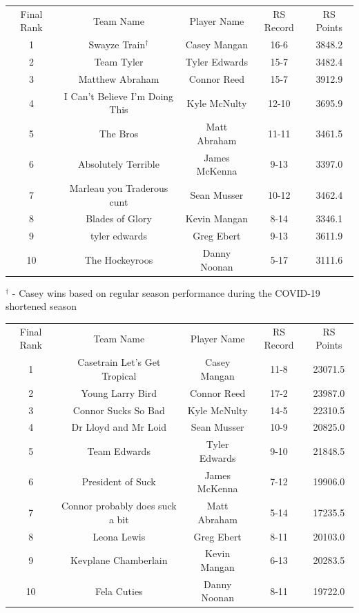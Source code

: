 \documentclass[11pt,letterpaper]{article}
\begin{document}
\vspace{-25pt}
\begin{table} [h]
\begin{center}
\begin{tabular} { c c c c c }
\\ Final Rank & Team Name & Player Name & RS Record & RS Points
\\ 1 & Swayze Train$^\dag$ & Casey Mangan & 16-6 & 3848.2
\\ 2 & Team Tyler & Tyler Edwards & 15-7 & 3482.4
\\ 3 & Matthew Abraham & Connor Reed & 15-7 & 3912.9
\\ 4 & I Can't Believe I'm Doing This & Kyle McNulty & 12-10 & 3695.9
\\ 5 & The Bros & Matt Abraham & 11-11 & 3461.5
\\ 6 & Absolutely Terrible & James McKenna & 9-13 & 3397.0
\\ 7 & Marleau you Traderous cunt & Sean Musser & 10-12 & 3462.4
\\ 8 & Blades of Glory & Kevin Mangan & 8-14 & 3346.1
\\ 9 & tyler edwards & Greg Ebert & 9-13 & 3611.9
\\ 10 & The Hockeyroos & Danny Noonan & 5-17 & 3111.6
\end{tabular}
\end{center}
\noindent$^\dag$ - Casey wins based on regular season performance during the COVID-19 shortened season
\end{table}

\newpage
{}
\vspace{-25pt}
\begin{table} [h]
\begin{center}
\begin{tabular} { c c c c c }
\\ Final Rank & Team Name & Player Name & RS Record & RS Points
\\ 1 & Casetrain Let's Get Tropical & Casey Mangan & 11-8 & 23071.5
\\ 2 & Young Larry Bird & Connor Reed & 17-2 & 23987.0
\\ 3 & Connor Sucks So Bad & Kyle McNulty & 14-5 & 22310.5
\\ 4 & Dr Lloyd and Mr Loid & Sean Musser & 10-9 & 20825.0
\\ 5 & Team Edwards & Tyler Edwards & 9-10 & 21848.5
\\ 6 & President of Suck & James McKenna & 7-12 & 19906.0
\\ 7 & Connor probably does suck a bit & Matt Abraham & 5-14 & 17235.5
\\ 8 & Leona Lewis & Greg Ebert & 8-11 & 20103.0
\\ 9 & Kevplane Chamberlain & Kevin Mangan & 6-13 & 20283.5
\\ 10 & Fela Cuties & Danny Noonan & 8-11 & 19722.0
\end{tabular}
\end{center}
\end{table}
\end{document}
